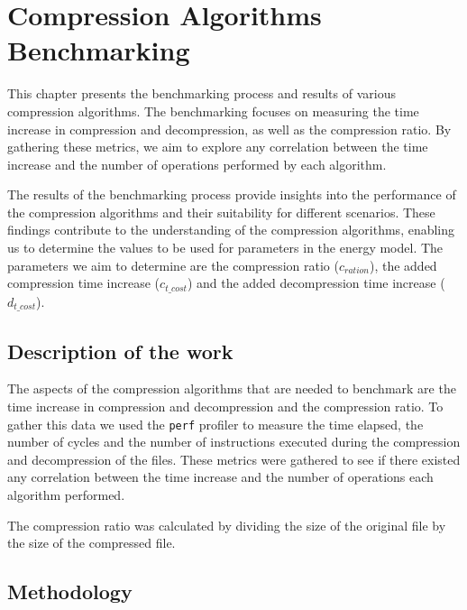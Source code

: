 \chapter{Compression Algorithms Benchmarking}
\label{chapter:compression_algorithms_benchmark}


\begin{introduction}
    This chapter presents the benchmarking process and results of various compression algorithms. The benchmarking focuses on measuring the time increase in compression and decompression, as well as the compression ratio. By gathering these metrics, we aim to explore any correlation between the time increase and the number of operations performed by each algorithm.

    The results of the benchmarking process provide insights into the performance of the compression algorithms and their suitability for different scenarios. These findings contribute to the understanding of the compression algorithms, enabling us to determine the values to be used for parameters in the energy model. The parameters we aim to determine are the compression ratio ($c_{ration}$), the added compression time increase ($c_{t\_cost}$) and the added decompression time increase ($d_{t\_cost}$).
\end{introduction}

\section{Description of the work}
        The aspects of the compression algorithms that are needed to benchmark are the time increase in compression and decompression and the compression ratio. To gather this data we used the \texttt{perf} profiler to measure the time elapsed, the number of cycles and the number of instructions executed during the compression and decompression of the files. These metrics were gathered to see if there existed any correlation between the time increase and the number of operations each algorithm performed. 
        
        The compression ratio was calculated by dividing the size of the original file by the size of the compressed file. 

\section{Methodology}

